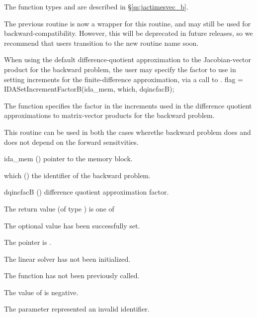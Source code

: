 {
  The function types  and
   are described in
  \S\ref{ss:jactimesvec_b}.

  The previous routine  is now a wrapper for this
  routine, and may still be used for backward-compatibility.  However,
  this will be deprecated in future releases, so we recommend that
  users transition to the new routine name soon.
}
When using the default difference-quotient approximation to the Jacobian-vector
product for the backward problem, the user may specify the factor to use in
setting increments for the finite-difference approximation, via a call to
.
{
  flag = IDASetIncrementFactorB(ida\_mem, which, dqincfacB);
}
{
  The function  specifies the factor
  in the increments used in the difference quotient approximations to matrix-vector
  products for the backward problem.

  This routine can be used in both the cases wherethe backward problem
  does and does not depend on the forward sensitvities.
}
{
  \begin{args}
  \item[ida\_mem] ()
    pointer to the {\idas} memory block.
  \item[which] ()
    the identifier of the backward problem.
  \item[dqincfacB] ()
    difference quotient approximation factor.
  \end{args}
}
{
  The return value  (of type ) is one of
  \begin{args}
  \item[\Id{IDALS\_SUCCESS}]
    The optional value has been successfully set.
  \item[\Id{IDALS\_MEM\_NULL}]
    The  pointer is .
  \item[\Id{IDALS\_LMEM\_NULL}]
    The {\idals} linear solver has not been initialized.
  \item[\Id{IDALS\_NO\_ADJ}]
    The function  has not been previously called.
  \item[\Id{IDALS\_ILL\_INPUT}]
    The value of  is negative.
  \item[\Id{IDALS\_ILL\_INPUT}]
    The parameter  represented an invalid identifier.
  \end{args}
}
